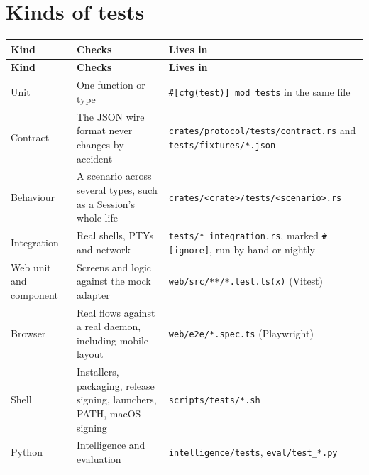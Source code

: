 \section{\texorpdfstring{Kinds of tests}{Kinds of tests}}

\begin{small}
\begin{longtable}{>{\raggedright\arraybackslash}p{0.167\dimexpr \linewidth-6\tabcolsep\relax}>{\raggedright\arraybackslash}p{0.421\dimexpr \linewidth-6\tabcolsep\relax}>{\raggedright\arraybackslash}p{0.412\dimexpr \linewidth-6\tabcolsep\relax}}
\toprule
\textbf{Kind} & \textbf{Checks} & \textbf{Lives in} \\
\midrule
\endfirsthead
\toprule
\textbf{Kind} & \textbf{Checks} & \textbf{Lives in} \\
\midrule
\endhead
Unit & One function or type & \texttt{\#[cfg(test)]\ mod\ tests} in the same file \\
Contract & The JSON wire format never changes by accident & \texttt{crates/\allowbreak{}protocol/\allowbreak{}tests/\allowbreak{}contract.\allowbreak{}rs} and \texttt{tests/\allowbreak{}fixtures/\allowbreak{}*.\allowbreak{}json} \\
Behaviour & A scenario across several types, such as a Session's whole life & \texttt{crates/\allowbreak{}\textless{}crate\textgreater{}/\allowbreak{}tests/\allowbreak{}\textless{}scenario\textgreater{}.\allowbreak{}rs} \\
Integration & Real shells, PTYs and network & \texttt{tests/\allowbreak{}*\_\allowbreak{}integration.\allowbreak{}rs}, marked \texttt{\#[ignore]}, run by hand or nightly \\
Web unit and component & Screens and logic against the mock adapter & \texttt{web/\allowbreak{}src/\allowbreak{}**/\allowbreak{}*.\allowbreak{}test.\allowbreak{}ts(x)} (Vitest) \\
Browser & Real flows against a real daemon, including mobile layout & \texttt{web/\allowbreak{}e2e/\allowbreak{}*.\allowbreak{}spec.\allowbreak{}ts} (Playwright) \\
Shell & Installers, packaging, release signing, launchers, PATH, macOS signing & \texttt{scripts/\allowbreak{}tests/\allowbreak{}*.\allowbreak{}sh} \\
Python & Intelligence and evaluation & \texttt{intelligence/\allowbreak{}tests}, \texttt{eval/\allowbreak{}test\_\allowbreak{}*.\allowbreak{}py} \\
\bottomrule
\end{longtable}
\end{small}

